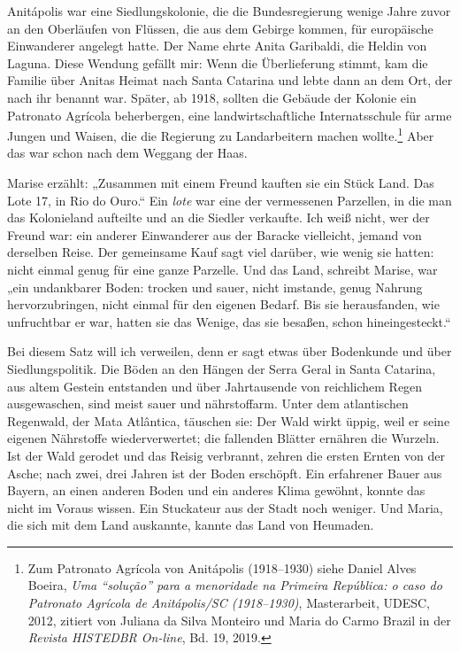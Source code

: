 \documentclass[
  ngerman,
  11pt,
  openany]{book}
\begin{document}
Anitápolis war eine Siedlungskolonie, die die Bundesregierung wenige
Jahre zuvor an den Oberläufen von Flüssen, die aus dem Gebirge kommen,
für europäische Einwanderer angelegt hatte. Der Name ehrte Anita
Garibaldi, die Heldin von Laguna. Diese Wendung gefällt mir: Wenn die
Überlieferung stimmt, kam die Familie über Anitas Heimat nach Santa
Catarina und lebte dann an dem Ort, der nach ihr benannt war. Später, ab
1918, sollten die Gebäude der Kolonie ein Patronato Agrícola
beherbergen, eine landwirtschaftliche Internatsschule für arme Jungen
und Waisen, die die Regierung zu Landarbeitern machen wollte.\footnote{Zum
  Patronato Agrícola von Anitápolis (1918--1930) siehe Daniel Alves
  Boeira, \emph{Uma ``solução'' para a menoridade na Primeira República:
  o caso do Patronato Agrícola de Anitápolis/SC (1918--1930)},
  Masterarbeit, UDESC, 2012, zitiert von Juliana da Silva Monteiro und
  Maria do Carmo Brazil in der \emph{Revista HISTEDBR On-line}, Bd. 19,
  2019.} Aber das war schon nach dem Weggang der Haas.

Marise erzählt: „Zusammen mit einem Freund kauften sie ein Stück Land.
Das Lote 17, in Rio do Ouro.`` Ein \emph{lote} war eine der vermessenen
Parzellen, in die man das Kolonieland aufteilte und an die Siedler
verkaufte. Ich weiß nicht, wer der Freund war: ein anderer Einwanderer
aus der Baracke vielleicht, jemand von derselben Reise. Der gemeinsame
Kauf sagt viel darüber, wie wenig sie hatten: nicht einmal genug für
eine ganze Parzelle. Und das Land, schreibt Marise, war „ein undankbarer
Boden: trocken und sauer, nicht imstande, genug Nahrung hervorzubringen,
nicht einmal für den eigenen Bedarf. Bis sie herausfanden, wie
unfruchtbar er war, hatten sie das Wenige, das sie besaßen, schon
hineingesteckt.``

Bei diesem Satz will ich verweilen, denn er sagt etwas über Bodenkunde
und über Siedlungspolitik. Die Böden an den Hängen der Serra Geral in
Santa Catarina, aus altem Gestein entstanden und über Jahrtausende von
reichlichem Regen ausgewaschen, sind meist sauer und nährstoffarm. Unter
dem atlantischen Regenwald, der Mata Atlântica, täuschen sie: Der Wald
wirkt üppig, weil er seine eigenen Nährstoffe wiederverwertet; die
fallenden Blätter ernähren die Wurzeln. Ist der Wald gerodet und das
Reisig verbrannt, zehren die ersten Ernten von der Asche; nach zwei,
drei Jahren ist der Boden erschöpft. Ein erfahrener Bauer aus Bayern, an
einen anderen Boden und ein anderes Klima gewöhnt, konnte das nicht im
Voraus wissen. Ein Stuckateur aus der Stadt noch weniger. Und Maria, die
sich mit dem Land auskannte, kannte das Land von Heumaden.
\end{document}
